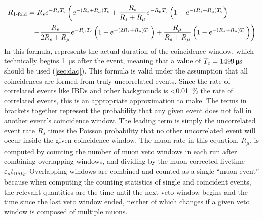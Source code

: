 \begin{align}
    \label{eq:rsingles}
    \begin{split}
        R_{\text{\fold{1}}}
          &= R_s e^{-R_s\tc}
          \left(
              e^{-(R_s + R_\mu)\tc} +
              \frac{R_s}{R_s+R_\mu} e^{-R_\mu\tc}
              \left(
                  1 - e^{-(R_s + R_\mu)\tc}
              \right)
          \right. \\
          &\ \ %
          \left. - \frac{R_s}{2R_s + R_\mu} e^{-R_\mu\tc}
              \left(
                  1 - e^{-(2R_s + R_\mu)\tc}
              \right) +
              \frac{R_\mu}{R_s + R_\mu}
              \left(
                  1 - e^{-(R_s + R_\mu)\tc}
              \right)
          \right)
    \end{split}
\end{align}
In this formula, \tc{} represents the actual duration of the coincidence window,
which technically begins \SI{1}{\micro\second} after the event,
meaning that a value of $T_c=\SI{1499}{\micro\second}$ should be used (\cref{sec:daq}).
This formula is valid under the assumption that all 
coincidences are formed from truly uncorrelated events.
Since the rate of correlated events like IBDs and other backgrounds
is \SI{<0.01}{\percent} the rate of correlated events,
this is an appropriate approximation to make.
The terms in brackets together represent the probability
that any given event does not fall in another event's coincidence window.
The leading term is simply the uncorrelated event rate $R_s$ times
the Poisson probability that no other uncorrelated event will occur
inside the given coincidence window.
The muon rate in this equation, $R_\mu$, is computed
by counting the number of muon veto windows in each run
after combining overlapping windows, and dividing by the muon-corrected
livetime $\varepsilon_\mu t_{\text{DAQ}}$.
Overlapping windows are combined and counted as a single ``muon event''
because when computing the counting statistics of single and coincident events,
the relevant quantities are the time until the next veto window begins
and the time since the last veto window ended,
neither of which changes if a given veto window
is composed of multiple muons.

